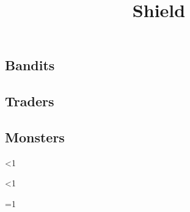 \documentclass[a4paper,openany]{book}
\title{\Glsentrytext{gm} Shield}
\begin{document}


\begin{multicols}{2}

\ifcase\value{temperature}\relax%
\or
  \encColdVillages
  \encColdEdge
  \encColdForest
\or
  \encMildVillages
  \encMildEdge
  \encMildForest
\or
  \encWarmVillages
  \encWarmEdge
  \encWarmForest
\else
  \encMildVillages
  \encMildEdge
  \encMildForest
\fi

\subsection*{Bandits}

\encBandits

\subsection*{Traders}

\encTraders

\subsection*{Monsters}

\encMonsters



\end{multicols}

\newpage

\begin{multicols}{2}

\ifnum\value{temperature}<1
  \wolf
  \ghast
\else
  \chitincrawler

  \basilisk
\fi

\griffin

\ifnum\value{temperature}<1
  \dryad
\fi

\mouthdigger

\woodspy

\woodspy

\ifnum\value{temperature}=1
  \umberhulk
\fi

\end{multicols}
\end{document}
